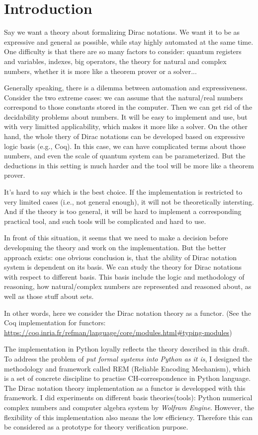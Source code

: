 
\section{Introduction}

Say we want a theory about formalizing Dirac notations. We want it to be as expressive and general as possible, while stay highly automated at the same time. One difficulty is that there are so many factors to consider: quantum registers and variables, indexes, big operators, the theory for natural and complex numbers, whether it is more like a theorem prover or a solver... 

Generally speaking, there is a dilemma between automation and expressiveness. Consider the two extreme cases: we can assume that the natural/real numbers correspond to those constants stored in the computer. Then we can get rid of the decidability problems about numbers. It will be easy to implement and use, but with very limitted applicability, which makes it more like a solver. On the other hand, the whole thery of Dirac notations can be developed based on expressive logic basis (e.g., Coq). In this case, we can have complicated terms about those numbers, and even the scale of quantum system can be parameterized. But the deductions in this setting is much harder and the tool will be more like a theorem prover.

It's hard to say which is the best choice. If the implementation is restricted to very limited cases (i.e., not general enough), it will not be theoretically intersting. And if the theory is too general, it will be hard to implement a corresponding practical tool, and such tools will be complicated and hard to use.

In front of this situation, it seems that we need to make a decision before developming the theory and work on the implementation. But the better approach exists: one obvious conclusion is, that the ability of Dirac notation system is dependent on its basis. We can study the theory for Dirac notations with respect to different basis.
This basis include the logic and methodology of reasoning, how natural/complex numbers are represented and reasoned about, as well as those stuff about sets. 

In other words, here we consider the Dirac notation theory as a functor. (See the Coq implementation for functors: \url{https://coq.inria.fr/refman/language/core/modules.html\#typing-modules})

The implementation in Python loyally reflects the theory described in this draft. To address the problem of \textit{put formal systems into Python as it is}, I designed the methodology and framework called REM (Reliable Encoding Mechanism), which is a set of concrete discipline to practise CH-correspondence in Python language. The Dirac notation theory implementation as a functor is developped with this framework. I did experiments on different basis theories(tools): Python numerical complex numbers and computer algebra system by \textit{Wolfram Engine}.
However, the flexibility of this implementation also means the low efficiency. Therefore this can be considered as a prototype for theory verification purpose.


